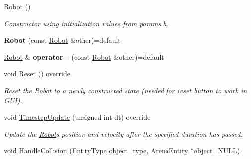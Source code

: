 \begin{DoxyCompactItemize}
\item 
\hyperlink{classRobot_a4fc7c70ae20623f05e06f2ecb388b6c4}{Robot} ()\hypertarget{classRobot_a4fc7c70ae20623f05e06f2ecb388b6c4}{}\label{classRobot_a4fc7c70ae20623f05e06f2ecb388b6c4}

\begin{DoxyCompactList}\small\item\em Constructor using initialization values from \hyperlink{params_8h}{params.\+h}. \end{DoxyCompactList}\item 
{\bfseries Robot} (const \hyperlink{classRobot}{Robot} \&other)=default\hypertarget{classRobot_a87ee951bb2c663a8bb427fdd2928a934}{}\label{classRobot_a87ee951bb2c663a8bb427fdd2928a934}

\item 
\hyperlink{classRobot}{Robot} \& {\bfseries operator=} (const \hyperlink{classRobot}{Robot} \&other)=default\hypertarget{classRobot_a69f171c4965ac4523cd95e2191405d37}{}\label{classRobot_a69f171c4965ac4523cd95e2191405d37}

\item 
void \hyperlink{classRobot_af597fd14927d2cd5308ded62f4e54e29}{Reset} () override\hypertarget{classRobot_af597fd14927d2cd5308ded62f4e54e29}{}\label{classRobot_af597fd14927d2cd5308ded62f4e54e29}

\begin{DoxyCompactList}\small\item\em Reset the \hyperlink{classRobot}{Robot} to a newly constructed state (needed for reset button to work in G\+UI). \end{DoxyCompactList}\item 
void \hyperlink{classRobot_ae790462f8782efcfd26082eedec30ed5}{Timestep\+Update} (unsigned int dt) override
\begin{DoxyCompactList}\small\item\em Update the \hyperlink{classRobot}{Robot}\textquotesingle{}s position and velocity after the specified duration has passed. \end{DoxyCompactList}\item 
void \hyperlink{classRobot_a176a9958cc2ea1e585ddb2cdc82c0bdb}{Handle\+Collision} (\hyperlink{entity__type_8h_ad79a57ed3105eb60d991a1aeb4a9dc44}{Entity\+Type} object\+\_\+type, \hyperlink{classArenaEntity}{Arena\+Entity} $\ast$object=N\+U\+LL)\hypertarget{classRobot_a176a9958cc2ea1e585ddb2cdc82c0bdb}{}\label{classRobot_a176a9958cc2ea1e585ddb2cdc82c0bdb}


\end{DoxyCompactItemize}
